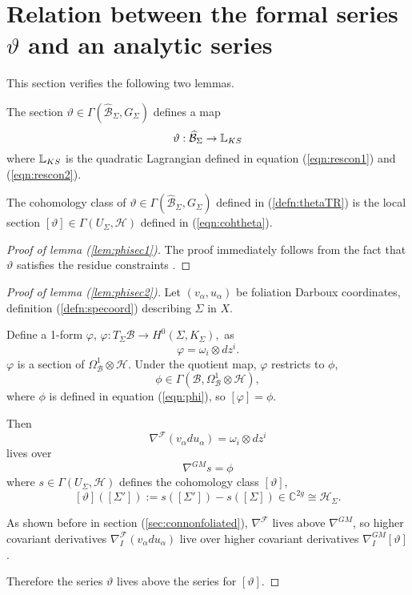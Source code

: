     \section{Relation between the formal series \texorpdfstring{\( \vartheta\)}{theta} and an analytic series}
    \label{sec:formalandanalytic}
    This section verifies the following two lemmas.
    \begin{lem}   \label{lem:phisec1}
    The section \( \vartheta\in\Gamma(\widehat{\mathcal{B}}_{\Sigma},G_\Sigma)\) defines a map
    \[ \vartheta:\widehat{\mathcal{B}}_{\Sigma}\to\mathbb{L}_{KS} \]
    where \(\mathbb{L}_{KS}\) is the quadratic Lagrangian defined in equation (\ref{eqn:rescon1}) and (\ref{eqn:rescon2}).
    \end{lem}
    
    \begin{lem}  \label{lem:phisec2}
    The cohomology class of \(\vartheta\in\Gamma(\widehat{\mathcal{B}}_{\Sigma},G_\Sigma)\) defined in (\ref{defn:thetaTR}) is the local section  \([\vartheta]\in \Gamma(U_\Sigma, \mathcal{H})\) defined in (\ref{eqn:cohtheta}). 
    \end{lem} 

    
    
    \begin{proof}[Proof of lemma (\ref{lem:phisec1})]
    The proof immediately follows from the fact that \( \vartheta\) satisfies the residue constraints \cite{chaimanowong2020airy}.
    \end{proof}
    
    
    \begin{proof}[Proof of lemma (\ref{lem:phisec2})]
    Let  \( (v_\alpha, u_\alpha ) \) be foliation Darboux coordinates, definition (\ref{defn:specoord}) describing \( \Sigma\) in \(X\).
    
    Define a 1-form \(\varphi\), \( \varphi :T_{\Sigma}\mathcal{B}\rightarrow  H^0(\Sigma,K_\Sigma), \)
    as 
    \[\varphi =  \omega_i\otimes dz^i.\]
    \( \varphi\) is a section of \(\Omega_{\mathcal{B}}^1\otimes \mathcal{H}\). Under the quotient map, \( \varphi\) restricts to \( \phi\),
    \[ \phi\in\Gamma(\mathcal{B},\Omega_{\mathcal{B}}^1\otimes\mathcal{H} ),\]
    where \( \phi\) is defined in equation (\ref{eqn:phi}), so \( [\varphi] = \phi \).
    
    Then 
    \[ \nabla^{\mathcal{F}} (v_\alpha du_\alpha)=\omega_i\otimes dz^i\]
    lives over 
    \[ \nabla^{GM}s=\phi\] 
    where \( s\in\Gamma(U_\Sigma,\mathcal{H})\) defines the cohomology class \( [\vartheta]\),
    \[ [\vartheta]([\Sigma']):=s([\Sigma'])-s([\Sigma])\in\mathbb{C}^{2g}\cong \mathcal{H}_\Sigma .\]

    As shown before in section (\ref{sec:connonfoliated}), \( \nabla^{\mathcal{F}} \) lives above \(\nabla^{GM}\), so higher covariant derivatives \(\nabla^\mathcal{F}_I(v_\alpha du_\alpha)\) live over higher covariant derivatives \(\nabla^{GM}_I[\vartheta]\).  
    
    
    Therefore the series \(\vartheta\) lives above the series for \([\vartheta]\).
    \end{proof}
    

